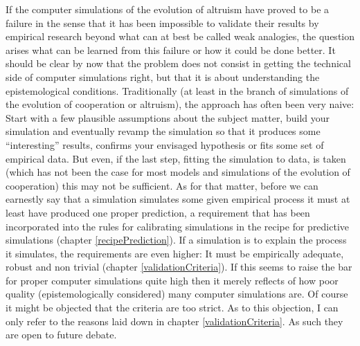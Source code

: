 If the computer simulations of the evolution of altruism have proved to be a
failure in the sense that it has been impossible to validate their results by
empirical research beyond what can at best be called weak analogies, the
question arises what can be learned from this failure or how it could be done
better. It should be clear by now that the problem does not consist in getting
the technical side of computer simulations right, but that it is about
understanding the epistemological conditions. Traditionally (at least in the
branch of simulations of the evolution of cooperation or altruism), the
approach has often been very naive: Start with a few plausible assumptions
about the subject matter, build your simulation and eventually revamp the
simulation so that it produces some
``interesting'' results, confirms your envisaged hypothesis or fits some set of
empirical data. But even, if the last step, fitting the
simulation to data, is taken (which has not been the case for most
models and simulations of the evolution of cooperation) this may not be
sufficient. As for that matter, before we can earnestly say that a simulation
simulates some given empirical process it must at least have produced one
proper prediction, a requirement that has been incorporated into the rules for
calibrating simulations in the recipe for predictive simulations (chapter
\ref{recipePrediction}). If a simulation is to explain the process it
simulates, the requirements are even higher: It must be empirically adequate,
robust and non trivial (chapter \ref{validationCriteria}). If this seems
to raise the bar for proper computer simulations quite high then it merely
reflects of how poor quality (epistemologically considered) many computer
simulations are. Of course it might be objected that the criteria are too
strict. As to this objection, I can only refer to the reasons laid down in chapter
\ref{validationCriteria}. As such they are open to future debate.
